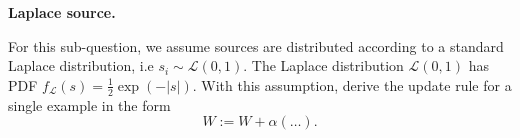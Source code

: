 \item {} \textbf{Laplace source.}

For this sub-question, we assume sources are distributed according to a standard Laplace distribution, i.e $s_i \sim \mathcal{L}(0,1)$. The Laplace distribution $\mathcal{L}(0,1)$ has PDF $f_{\mathcal{L}}(s) = \frac{1}{2}\exp\left(-|s| \right)$. With this assumption, derive the update rule for a single example in the form
$$ W := W + \alpha \left(\ldots\right).$$

